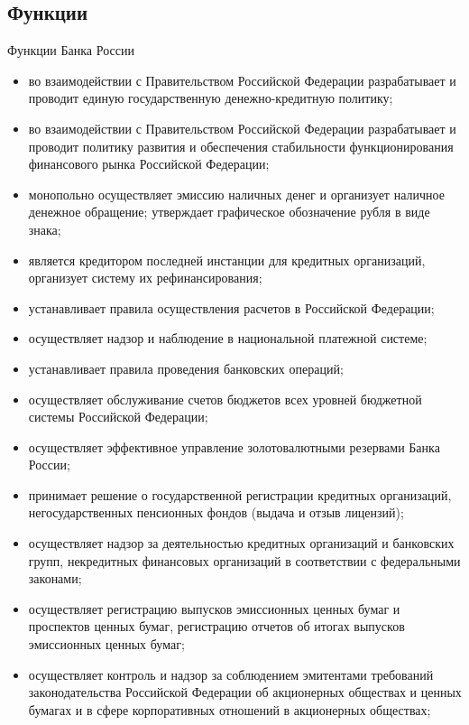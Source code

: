 \documentclass[_DKB_p1_Money.tex]{subfiles}
\begin{document}
\subsection{Функции }
\begin{frame}[ allowframebreaks]{Функции Банка России}
\begin{itemize}
\item
во взаимодействии с Правительством Российской Федерации разрабатывает и проводит единую государственную денежно-кредитную политику; 
\item
во взаимодействии с Правительством Российской Федерации разрабатывает и проводит политику развития и обеспечения стабильности функционирования финансового рынка Российской Федерации;
\item
монопольно осуществляет эмиссию наличных денег и организует наличное денежное обращение; утверждает графическое обозначение рубля в виде знака;
\item
является кредитором последней инстанции для кредитных организаций, организует систему их рефинансирования;

\pagebreak
\item
устанавливает правила осуществления расчетов в Российской Федерации;
\item
осуществляет надзор и наблюдение в национальной платежной системе;
\item
устанавливает правила проведения банковских операций;
\item
осуществляет обслуживание счетов бюджетов всех уровней бюджетной системы Российской Федерации;

\pagebreak
\item
осуществляет эффективное управление золотовалютными резервами Банка России;

\item
принимает решение о государственной регистрации кредитных организаций, негосударственных пенсионных фондов (выдача и отзыв лицензий);
\item
осуществляет надзор за деятельностью кредитных организаций и банковских групп,  некредитных финансовых организаций в соответствии с федеральными законами;

\pagebreak
\item
осуществляет регистрацию выпусков эмиссионных ценных бумаг и проспектов ценных бумаг, регистрацию отчетов об итогах выпусков эмиссионных ценных бумаг;
\item
осуществляет контроль и надзор за соблюдением эмитентами требований законодательства Российской Федерации об акционерных обществах и ценных бумагах и в сфере корпоративных отношений в акционерных обществах;


\end{itemize}
\end{frame}
\end{document}
